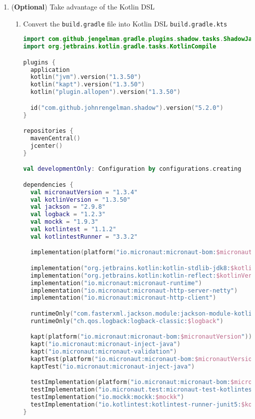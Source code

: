 \begin{enumerate}
\item (\textbf{Optional}) Take advantage of the Kotlin DSL

\begin{enumerate}

\item Convert the \texttt{build.gradle} file into Kotlin DSL \texttt{build.gradle.kts}

\begin{lstlisting}[language=Kotlin]
import com.github.jengelman.gradle.plugins.shadow.tasks.ShadowJar
import org.jetbrains.kotlin.gradle.tasks.KotlinCompile

plugins {
  application
  kotlin("jvm").version("1.3.50")
  kotlin("kapt").version("1.3.50")
  kotlin("plugin.allopen").version("1.3.50")

  id("com.github.johnrengelman.shadow").version("5.2.0")
}

repositories {
  mavenCentral()
  jcenter()
}

val developmentOnly: Configuration by configurations.creating

dependencies {
  val micronautVersion = "1.3.4"
  val kotlinVersion = "1.3.50"
  val jackson = "2.9.8"
  val logback = "1.2.3"
  val mockk = "1.9.3"
  val kotlintest = "1.1.2"
  val kotlintestRunner = "3.3.2"

  implementation(platform("io.micronaut:micronaut-bom:$micronautVersion"))

  implementation("org.jetbrains.kotlin:kotlin-stdlib-jdk8:$kotlinVersion")
  implementation("org.jetbrains.kotlin:kotlin-reflect:$kotlinVersion")
  implementation("io.micronaut:micronaut-runtime")
  implementation("io.micronaut:micronaut-http-server-netty")
  implementation("io.micronaut:micronaut-http-client")

  runtimeOnly("com.fasterxml.jackson.module:jackson-module-kotlin:$jackson")
  runtimeOnly("ch.qos.logback:logback-classic:$logback")

  kapt(platform("io.micronaut:micronaut-bom:$micronautVersion"))
  kapt("io.micronaut:micronaut-inject-java")
  kapt("io.micronaut:micronaut-validation")
  kaptTest(platform("io.micronaut:micronaut-bom:$micronautVersion"))
  kaptTest("io.micronaut:micronaut-inject-java")

  testImplementation(platform("io.micronaut:micronaut-bom:$micronautVersion"))
  testImplementation("io.micronaut.test:micronaut-test-kotlintest:$kotlintest")
  testImplementation("io.mockk:mockk:$mockk")
  testImplementation("io.kotlintest:kotlintest-runner-junit5:$kotlintestRunner")
}


\end{lstlisting}
\end{enumerate}
\end{enumerate}

